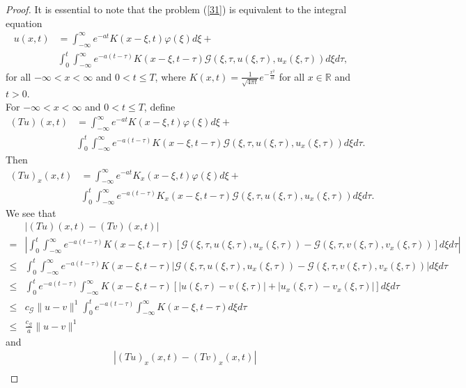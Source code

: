\documentclass[11pt,reqno,a4paper]{amsart}
\theoremstyle{plain}
\theoremstyle{definition}
\theoremstyle{remark}
\numberwithin{equation}{section}
\begin{document}
\begin{proof}
It is essential to note that the problem (\ref{31}) is equivalent to the integral equation 
\begin{align}\label{34}
u(x,t)&=\int_{-\infty}^\infty e^{-at} K(x-\xi,t)\varphi(\xi)d\xi+\nonumber\\
&\int_0^t \int_{-\infty}^\infty e^{-a(t-\tau)} K(x-\xi,t-\tau)\mathcal{G}(\xi,\tau,u(\xi,\tau),u_x(\xi,\tau))d\xi d\tau,
\end{align}
for all $-\infty<x<\infty$ and $0<t\le T$, where $K(x,t)=\frac{1}{\sqrt{4\pi t}}e^{-\frac{x^2}{4t}}$ for all $x\in \mathbb{R}$ and $t>0$.\\
For $-\infty<x<\infty$ and $0<t\le T$, define 
\begin{align*}
(Tu)(x,t)&=\int_{-\infty}^\infty e^{-at} K(x-\xi,t)\varphi(\xi)d\xi+\\
&\int_0^t \int_{-\infty}^\infty e^{-a(t-\tau)} K(x-\xi,t-\tau)\mathcal{G}(\xi,\tau,u(\xi,\tau),u_x(\xi,\tau))d\xi d\tau.
\end{align*}
Then 
\begin{align*}
(Tu)_x(x,t)&=\int_{-\infty}^\infty e^{-at} K_x(x-\xi,t)\varphi(\xi)d\xi+\\
&\int_0^t \int_{-\infty}^\infty e^{-a(t-\tau)} K_x(x-\xi,t-\tau)\mathcal{G}(\xi,\tau,u(\xi,\tau),u_x(\xi,\tau))d\xi d\tau.
\end{align*}
We see that
\begin{align}\label{35}
&|(Tu)(x,t)-(Tv)(x,t)|\nonumber\\
=&\left\lvert\int_0^t \int_{-\infty}^\infty e^{-a(t-\tau)} K(x-\xi,t-\tau)[\mathcal{G}(\xi,\tau,u(\xi,\tau),u_x(\xi,\tau))-\mathcal{G}(\xi,\tau,v(\xi,\tau),v_x(\xi,\tau))]d\xi d\tau\right\rvert\nonumber\\
\le & \int_0^t \int_{-\infty}^\infty e^{-a(t-\tau)} K(x-\xi,t-\tau)|\mathcal{G}(\xi,\tau,u(\xi,\tau),u_x(\xi,\tau))-\mathcal{G}(\xi,\tau,v(\xi,\tau),v_x(\xi,\tau))|d\xi d\tau\nonumber\\
\le & \int_0^t e^{-a(t-\tau)} \int_{-\infty}^\infty  K(x-\xi,t-\tau)[|u(\xi,\tau)-v(\xi,\tau)|+|u_x(\xi,\tau)-v_x(\xi,\tau)|]d\xi d\tau\nonumber\\
\le & c_\mathcal{G} \|u-v\|^1\int_0^t e^{-a(t-\tau)} \int_{-\infty}^\infty  K(x-\xi,t-\tau)d\xi d\tau\nonumber\\
\le & \frac{c_\mathcal{G}}{a} \|u-v\|^1
\end{align}
and
\begin{align}\label{36}
&|(Tu)_x(x,t)-(Tv)_x(x,t)|\nonumber\\

\end{align}
\end{proof}
\end{document}
